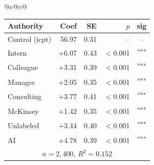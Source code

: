\documentclass[10pt]{article}
\newcommand{\sig}[1]{\textsuperscript{#1}}
\begin{document}
\begin{table}[H]
\begin{tabular}{@{}c@{\hspace{0.5em}}c@{}}
\begin{minipage}[t]{0.49\textwidth}
\begin{tabular}{@{}l r r r c@{}}
\toprule
Authority & Coef & SE & $p$ & sig \\
\midrule
\cellcolor{gray!22}Control (icpt) & \cellcolor{gray!22}56.97 & \cellcolor{gray!22}0.31 & \cellcolor{gray!22}-- & \cellcolor{gray!22}-- \\
\midrule
Intern & +6.07 & 0.43 & $<$0.001 & \sig{***} \\
Colleague & +3.31 & 0.39 & $<$0.001 & \sig{***} \\
Manager & +2.05 & 0.35 & $<$0.001 & \sig{***} \\
\midrule
Consulting & +3.77 & 0.41 & $<$0.001 & \sig{***} \\
McKinsey & +1.42 & 0.35 & $<$0.001 & \sig{***} \\
\midrule
Unlabeled & +3.44 & 0.40 & $<$0.001 & \sig{***} \\
AI & +4.78 & 0.39 & $<$0.001 & \sig{***} \\
\midrule
\multicolumn{5}{c}{\scriptsize $n=2{,}400$, $R^2=0.152$} \\
\bottomrule\end{tabular}
\end{minipage} \\
\end{tabular}
\end{table}
\end{document}
